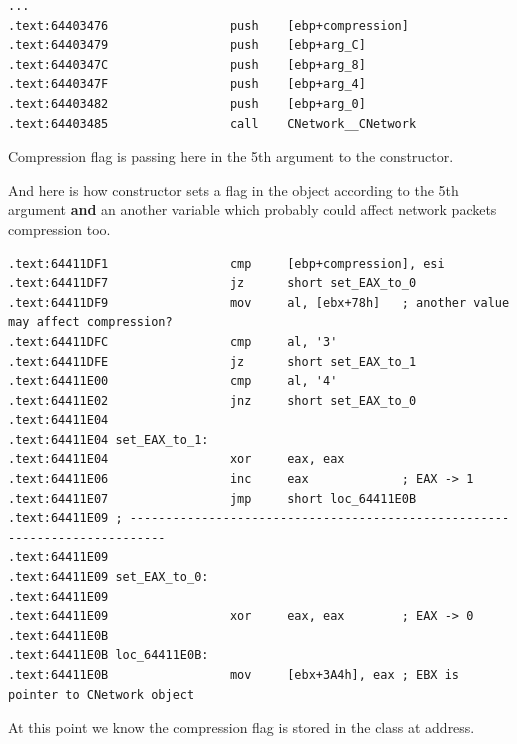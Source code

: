 \begin{lstlisting}
...
.text:64403476                 push    [ebp+compression]
.text:64403479                 push    [ebp+arg_C]
.text:6440347C                 push    [ebp+arg_8]
.text:6440347F                 push    [ebp+arg_4]
.text:64403482                 push    [ebp+arg_0]
.text:64403485                 call    CNetwork__CNetwork
\end{lstlisting}

{Compression flag is passing here in the 5th argument to the  constructor.}

{And here is how  constructor sets a flag in the  object according to the 5th argument \textbf{and}
an another variable which probably could affect network packets compression too.}

\begin{lstlisting}
.text:64411DF1                 cmp     [ebp+compression], esi
.text:64411DF7                 jz      short set_EAX_to_0
.text:64411DF9                 mov     al, [ebx+78h]   ; another value may affect compression?
.text:64411DFC                 cmp     al, '3'
.text:64411DFE                 jz      short set_EAX_to_1
.text:64411E00                 cmp     al, '4'
.text:64411E02                 jnz     short set_EAX_to_0
.text:64411E04
.text:64411E04 set_EAX_to_1:
.text:64411E04                 xor     eax, eax
.text:64411E06                 inc     eax             ; EAX -> 1
.text:64411E07                 jmp     short loc_64411E0B
.text:64411E09 ; ---------------------------------------------------------------------------
.text:64411E09
.text:64411E09 set_EAX_to_0:
.text:64411E09
.text:64411E09                 xor     eax, eax        ; EAX -> 0
.text:64411E0B
.text:64411E0B loc_64411E0B:
.text:64411E0B                 mov     [ebx+3A4h], eax ; EBX is pointer to CNetwork object
\end{lstlisting}

{At this point we know the compression flag is stored in the  class at  address.}

